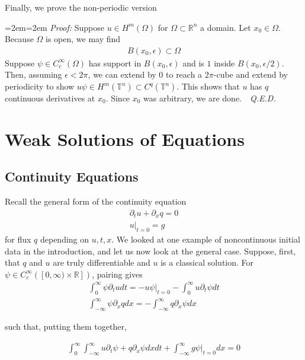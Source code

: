 \documentclass{article}
\newcommand{\R}{{\mathbb{R}}}
\newcommand{\pd}{\partial}
\newcommand{\CC}{C_{c}^{\infty}}
\newenvironment{pf}{%
	\par%
	\medskip
	\leftskip=2em\rightskip=2em%
	\noindent\ignorespaces \textit{Proof:} \newline}{%
	\,\, \newline \textit{Q.E.D.}\par\medskip}
\begin{document}
	
	Finally, we prove the non-periodic version
	
	\begin{pf}
		Suppose $u \in H^{m}(\Omega)$ for $\Omega \subset\R^{n}$ a domain. Let $x_0 \in \Omega$. Because $\Omega$ is open, we may find 
		\begin{align*}
			B(x_0,\epsilon) \subset \Omega
		\end{align*}
		Suppose $\psi \in \CC(\Omega)$ has support in $B(x_0,\epsilon)$ and is $1$ inside $B(x_0,\epsilon/2)$. Then, assuming $\epsilon < 2\pi$, we can extend by $0$ to reach a $2\pi$-cube and extend by periodicity to show $u\psi \in H^{m}(\mathbb{T}^{n}) \subset C^{q}(\mathbb{T}^{n})$. This shows that $u$ has $q$ continuous derivatives at $x_0$. Since $x_0$ was arbitrary, we are done. 
	\end{pf}
	
	
	
	
	
	
	\section{Weak Solutions of Equations}
	
	\subsection{Continuity Equations}
	
	Recall the general form of the continuity equation 
	\begin{align*}
		\pd_{t} u + \pd_{x} q = 0 \\
		u|_{t=0} = g
	\end{align*}
	for flux $q$ depending on $u,t,x$. We looked at one example of noncontinuous initial data in the introduction, and let us now look at the general case. Suppose, first, that $q$ and $u$ are truly differentiable and $u$ is a classical solution. For $\psi \in \CC([0,\infty) \times \R])$, pairing gives 
	\begin{align*}
		\int_{0}^{\infty} \psi\pd_{t} udt = -u\psi|_{t=0} - \int_{0}^{\infty} u \pd_{t}\psi dt \\
		\int_{-\infty}^{\infty} \psi \pd_{x}q dx = - \int_{-\infty}^{\infty} q \pd_{x} \psi dx
	\end{align*}
	
	such that, putting them together,
	
	\begin{align*}
		\int_{0}^{\infty} \int_{-\infty}^{\infty} u \pd_{t} \psi + q \pd_{x} \psi dx dt + \int_{-\infty}^{\infty} g \psi |_{t=0} dx = 0
	\end{align*}
	
\end{document}

